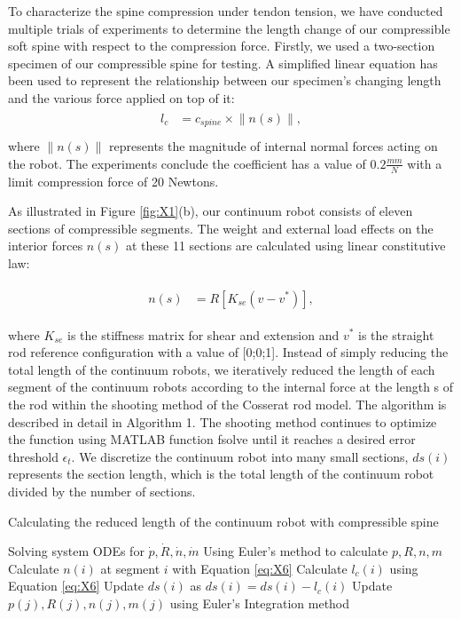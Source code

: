 To characterize the spine compression under tendon tension, we have conducted multiple trials of experiments to determine the length change of our compressible soft spine with respect to the compression force. Firstly, we used a two-section specimen of our compressible spine for testing. A simplified linear equation has been used to represent the relationship between our specimen's changing length and the various force applied on top of it:
\begin{align}
    \begin{split}
        l_c&=c_{spine}\times{\left \|  n(s)\right \|},\\
     \end{split}
     \label{eq:X6}
\end{align}
where $\left \|  n(s)\right \|$ represents the magnitude of internal normal forces acting on the robot. The experiments conclude the coefficient has a value of $0.2\frac{mm}{N}$ with a limit compression force of 20 Newtons. 


As illustrated in Figure \ref{fig:X1}(b), our continuum robot consists of eleven sections of compressible segments. The weight and external load effects on the interior forces $n(s)$ at these 11 sections are calculated using linear constitutive law:

\begin{align}
    \begin{split}
        n(s) & =R[K_{se}(v-v^*)],   
    \end{split}
    \label{eq:X7}
\end{align}

where $K_{se}$ is the stiffness matrix for shear and extension and $v^*$ is the straight rod reference configuration with a value of [0;0;1].
Instead of simply reducing the total length of the continuum robots, we iteratively reduced the length of each segment of the continuum robots according to the internal force at the length s of the rod within the shooting method of the Cosserat rod model. The algorithm is described in detail in Algorithm 1. The shooting method continues to optimize the function using MATLAB function fsolve until it reaches a desired error threshold $\epsilon_t$. We discretize the continuum robot into many small sections, $ds(i)$ represents the section length, which is the total length  of the continuum robot divided by the number of sections. 

\begin{algorithm}[t]
\caption{Calculating  the reduced length of the continuum robot with compressible spine}
\label{alg:X1}
\begin{algorithmic}
\State Solving system ODEs for $\dot{p}, \dot{R}, \dot{n}, \dot{m}$
\State Using Euler's method to calculate $p,R,n,m$
\State Calculate $n(i)$ at segment $i$ with Equation \eqref{eq:X6}
\State Calculate $l_c(i)$ using Equation \eqref{eq:X6}
\State Update $ds(i)$ as $ds(i)=ds(i)-l_c(i)$
\State Update $p(j),R(j),n(j),m(j)$ using Euler's Integration method
\EndFor
\EndFor
\EndWhile
\end{algorithmic}
\end{algorithm}


